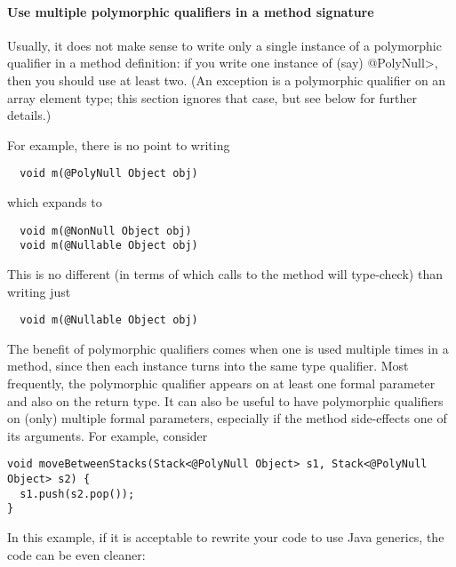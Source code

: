 \paragraph{Use multiple polymorphic qualifiers in a method signature\label{qualifier-polymorphism-multiple-qualifiers}}


Usually, it does not make sense to write only a single instance of a polymorphic
qualifier in a method definition:  if you write one instance of (say)
\<@PolyNull>, then you should use at least two.  (An exception is a
polymorphic qualifier on an array element type; this section ignores that
case, but see below for further details.)

For example, there is no point to writing

\begin{Verbatim}
  void m(@PolyNull Object obj)
\end{Verbatim}

\noindent
which expands to

\begin{Verbatim}
  void m(@NonNull Object obj)
  void m(@Nullable Object obj)
\end{Verbatim}

This is no different (in terms of which calls to the method will
type-check) than writing just

\begin{Verbatim}
  void m(@Nullable Object obj)
\end{Verbatim}

The benefit of polymorphic qualifiers comes when one is used multiple times
in a method, since then each instance turns into the same type qualifier.
Most frequently, the polymorphic qualifier appears on at least one formal
parameter and also on the return type.  It can also be useful to have
polymorphic qualifiers on (only) multiple formal parameters, especially if
the method side-effects one of its arguments.
For example, consider

\begin{Verbatim}
void moveBetweenStacks(Stack<@PolyNull Object> s1, Stack<@PolyNull Object> s2) {
  s1.push(s2.pop());
}
\end{Verbatim}

\noindent
In this example, if it is acceptable to rewrite your code to use Java
generics, the code can be even cleaner:

